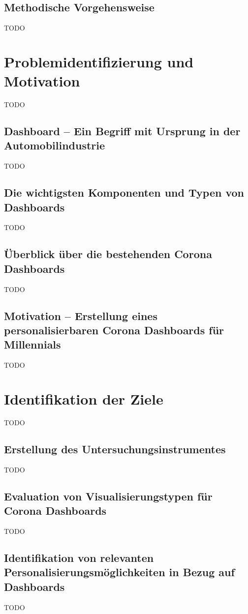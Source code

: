 \documentclass[12pt, oneside]{article}
\begin{document}
\subsection{Methodische Vorgehensweise}
TODO

\clearpage
\section{Problemidentifizierung und Motivation}
TODO

\subsection{Dashboard – Ein Begriff mit Ursprung in der Automobilindustrie}
TODO

\subsection{Die wichtigsten Komponenten und Typen von Dashboards}
TODO

\subsection{Überblick über die bestehenden Corona Dashboards}
TODO

\subsection{Motivation – Erstellung eines personalisierbaren Corona Dashboards für Millennials}
TODO

\clearpage
\section{Identifikation der Ziele}
TODO

\subsection{Erstellung des Untersuchungsinstrumentes}
TODO

\subsection{Evaluation von Visualisierungstypen für Corona Dashboards}
TODO

\subsection{Identifikation von relevanten Personalisierungsmöglichkeiten in Bezug auf Dashboards}
TODO
\end{document}
